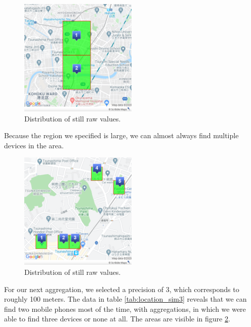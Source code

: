 \begin{figure}[htbp]
  \centering
  \includegraphics[width=0.5\textwidth]{figures/acc2}
  \caption{Distribution of still raw values.} \label{fig:acc2}
\end{figure}

Because the region we specified is large, we can almost always find multiple devices in the area.

\begin{figure}[htbp]
  \centering
  \includegraphics[width=0.5\textwidth]{figures/acc3}
  \caption{Distribution of still raw values.} \label{fig:acc3}
\end{figure}

For our next aggregation, we selected a precision of 3, which corresponds to roughly 100 meters. The data in table \ref{tab:location_sim3} reveals that we can find two mobile phones most of the time, with aggregations, in which we were able to find three devices or none at all. The areas are visible in figure \ref{fig:acc3}.

